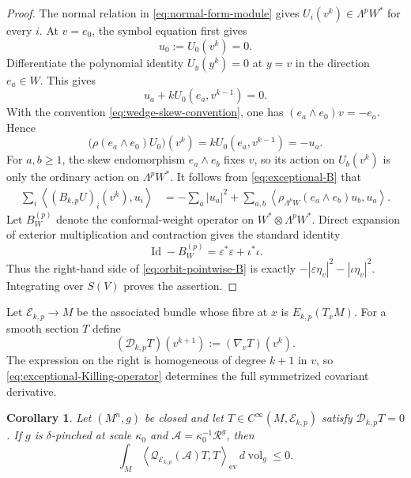\documentclass[reqno,11pt]{amsart}
\newtheorem{corollary}[theorem]{Corollary}
\theoremstyle{definition}
\newcommand{\Rop}{\mathscr R}
\newcommand{\cA}{\mathcal A}
\newcommand{\cQ}{\mathcal Q}
\newcommand{\Id}{\operatorname{Id}}
\newcommand{\vol}{\operatorname{vol}}
\newcommand{\cD}{\mathcal D}
\newcommand{\inner}[2]{\left\langle #1,#2\right\rangle}
\begin{document}
\begin{proof}
The normal relation in \eqref{eq:normal-form-module} gives
$U_i(v^k)\in\Lambda^pW^*$ for every $i$.  At $v=e_0$, the symbol equation
first gives
\begin{equation*}
 u_0:=U_0(v^k)=0.
\end{equation*}
Differentiate the polynomial identity $U_y(y^k)=0$ at $y=v$ in the
direction $e_a\in W$.  This gives
\begin{equation*}
 u_a+kU_0(e_a,v^{k-1})=0.
\end{equation*}
With the convention \eqref{eq:wedge-skew-convention}, one has
$(e_a\wedge e_0)v=-e_a$.  Hence
\begin{equation*}
 \bigl(\rho(e_a\wedge e_0)U_0\bigr)(v^k)
 =kU_0(e_a,v^{k-1})=-u_a.
\end{equation*}
For $a,b\geq1$, the skew endomorphism $e_a\wedge e_b$ fixes $v$, so its
action on $U_b(v^k)$ is only the ordinary action on
$\Lambda^pW^*$.  It follows from \eqref{eq:exceptional-B} that
\begin{align}
 \sum_i\inner{(B_{k,p}U)_i(v^k)}{u_i}
 &=-\sum_a|u_a|^2
   +\sum_{a,b}
    \inner{\rho_{\Lambda^pW}(e_a\wedge e_b)u_b}{u_a}.
 \label{eq:orbit-pointwise-B}
\end{align}
Let $B_W^{(p)}$ denote the conformal-weight operator on
$W^*\otimes\Lambda^pW^*$.  Direct expansion of exterior multiplication and
contraction gives the standard identity
\begin{equation*}
 \Id-B_W^{(p)}=\varepsilon^*\varepsilon+\iota^*\iota.
\end{equation*}
Thus the right-hand side of \eqref{eq:orbit-pointwise-B} is exactly
$-|\varepsilon\eta_v|^2-|\iota\eta_v|^2$.  Integrating over $S(V)$ proves
the assertion.
\end{proof}

Let $\mathscr E_{k,p}\to M$ be the associated bundle whose fibre at $x$
is $E_{k,p}(T_xM)$.  For a smooth section $T$ define
\begin{equation}\label{eq:exceptional-Killing-operator}
 (\cD_{k,p}T)(v^{k+1}):=(\nabla_vT)(v^k).
\end{equation}
The expression on the right is homogeneous of degree $k+1$ in $v$, so
\eqref{eq:exceptional-Killing-operator} determines the full symmetrized
covariant derivative.

\begin{corollary}
\label{cor:exceptional-integral-sign}
Let $(M^n,g)$ be closed and let
$T\in C^\infty(M,\mathscr E_{k,p})$ satisfy $\cD_{k,p}T=0$.  If $g$ is
$\delta$-pinched at scale $\kappa_0$ and
$\cA=\kappa_0^{-1}\Rop^g$, then
\begin{equation*}
 \int_M
 \inner{\cQ_{\mathscr E_{k,p}}(\cA)T}{T}_{\mathrm{ev}}
 \,d\vol_g\leq0.
\end{equation*}
\end{corollary}
\end{document}
